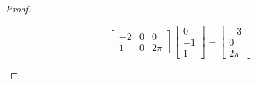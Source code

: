 \documentclass[openany]{book}
\begin{document}
\begin{proof}
\begin{enumerate}
\begin{equation*}
\begin{bmatrix}
                -2&0&0\\
                1&0&2\pi
            \end{bmatrix}\begin{bmatrix}
                0\\
                -1\\
                1
            \end{bmatrix}=\begin{bmatrix}
                -3\\
                0\\
                2\pi
            \end{bmatrix}
        \end{equation*}
    \end{enumerate}
\end{proof}
\end{document}
